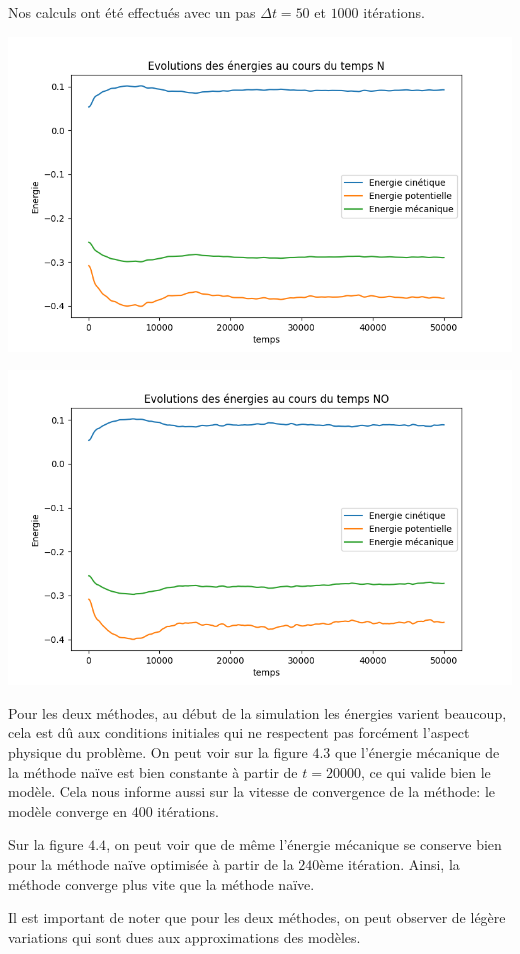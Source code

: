 Nos calculs ont été effectués avec un pas $\Delta t = 50 $ et $1000$ itérations.

\begin{center}
\includegraphics[scale=0.6]{resultats/Energy_N.png}
\captionsetup{hypcap=false}
\label{fig4}
\end{center} 

\begin{center}
\includegraphics[scale=0.6]{resultats/Energy_NO.png}
\captionsetup{hypcap=false}
\label{fig5}
\end{center} 


Pour les deux méthodes, au début de la simulation les énergies
varient beaucoup, cela est dû aux conditions initiales qui ne
respectent pas forcément l'aspect physique du problème.
On peut voir sur la figure $4.3$ que l'énergie mécanique de la
méthode naïve est bien constante à partir de $t=20000$, ce qui
valide bien le modèle. Cela nous informe aussi sur la vitesse de
convergence de la méthode: le modèle converge en $400$ itérations.

Sur la figure $4.4$, on peut voir que de même l'énergie mécanique
se conserve bien pour la méthode naïve optimisée à partir de la
$240$ème itération. Ainsi, la méthode converge plus vite que la 
méthode naïve.

Il est important de noter que pour les deux méthodes, on peut
observer de légère variations qui sont dues aux approximations des
modèles.